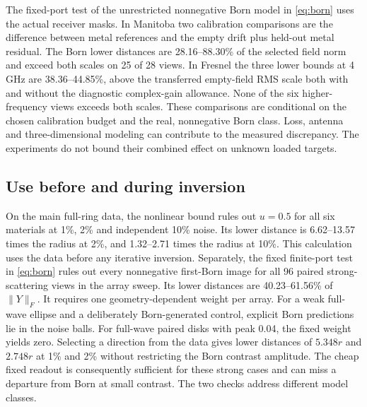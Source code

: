 The fixed-port test of the unrestricted nonnegative Born model in \eqref{eq:born} uses the actual receiver masks. In Manitoba two calibration comparisons are the difference between metal references and the empty drift plus held-out metal residual. The Born lower distances are 28.16--88.30\% of the selected field norm and exceed both scales on 25 of 28 views. In Fresnel the three lower bounds at 4 GHz are 38.36--44.85\%, above the transferred empty-field RMS scale both with and without the diagnostic complex-gain allowance. None of the six higher-frequency views exceeds both scales. These comparisons are conditional on the chosen calibration budget and the real, nonnegative Born class. Loss, antenna and three-dimensional modeling can contribute to the measured discrepancy. The experiments do not bound their combined effect on unknown loaded targets.

\subsection{Use before and during inversion}\label{sec:exp-inversion}

On the main full-ring data, the nonlinear bound rules out \(u=0.5\) for all six materials at 1\%, 2\% and independent 10\% noise. Its lower distance is 6.62--13.57 times the radius at 2\%, and 1.32--2.71 times the radius at 10\%. This calculation uses the data before any iterative inversion. Separately, the fixed finite-port test in \eqref{eq:born} rules out every nonnegative first-Born image for all 96 paired strong-scattering views in the array sweep. Its lower distances are 40.23--61.56\% of \(\|Y\|_F\). It requires one geometry-dependent weight per array. For a weak full-wave ellipse and a deliberately Born-generated control, explicit Born predictions lie in the noise balls. For full-wave paired disks with peak 0.04, the fixed weight yields zero. Selecting a direction from the data gives lower distances of \(5.348r\) and \(2.748r\) at 1\% and 2\% without restricting the Born contrast amplitude. The cheap fixed readout is consequently sufficient for these strong cases and can miss a departure from Born at small contrast. The two checks address different model classes.

